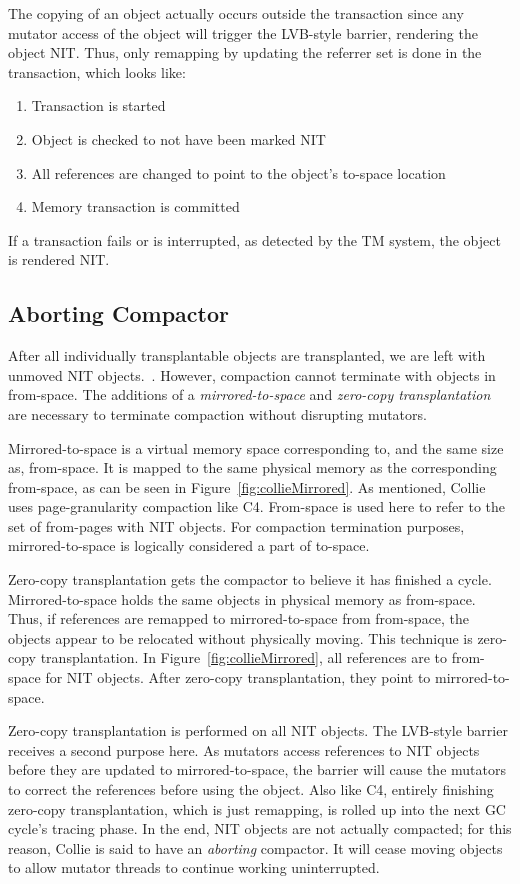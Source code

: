 \documentclass{sig-alternate}
\begin{document}
The copying of an object actually occurs outside the transaction since any
mutator access of the object will trigger the LVB-style barrier,
rendering the object NIT. Thus, only remapping by updating the referrer set
is done in the transaction, which looks like:
\begin{enumerate}
\item Transaction is started
\item Object is checked to not have been marked NIT
\item All references are changed to point to the object's to-space location
\item Memory transaction is committed
\end{enumerate}
If a transaction fails or is interrupted, as detected by the TM system, the object is rendered NIT.


\subsection{Aborting Compactor}
\label{sec:collieAbortion}

After all individually transplantable objects are transplanted, we
are left with unmoved NIT objects.~\cite{Iyengar:Collie}.
However, compaction cannot terminate with objects in from-space.
The additions of a \emph{mirrored-to-space} and \emph{zero-copy transplantation} are necessary
to terminate compaction without disrupting mutators.

Mirrored-to-space is a virtual memory space corresponding to, and the same
size as, from-space. It is mapped to the same physical
memory as the corresponding from-space, as can be seen in Figure~\ref{fig:collieMirrored}. As mentioned, 
Collie uses page-granularity compaction like C4. From-space is used here 
to refer to the set of from-pages with NIT objects. For compaction 
termination purposes, mirrored-to-space is logically considered a part of to-space.

Zero-copy transplantation gets the compactor to believe it has finished a cycle.
Mirrored-to-space holds the same objects in physical memory as from-space.
Thus, if references
are remapped to mirrored-to-space from from-space,
the objects appear to be relocated without physically moving. This technique
is zero-copy transplantation. In Figure~\ref{fig:collieMirrored},
all references are to from-space for NIT objects. After zero-copy transplantation, they
point to mirrored-to-space.

Zero-copy transplantation
is performed on all NIT objects. The LVB-style barrier receives a second purpose here. As mutators
access references to NIT objects before they are updated to mirrored-to-space, 
the barrier will cause the mutators to correct the references before using the object. Also like
C4, entirely finishing zero-copy transplantation, which is just remapping, is rolled
up into the next GC cycle's tracing phase. In the end, NIT objects are not actually compacted;
for this reason, Collie is said to have an \emph{aborting} compactor. It will
cease moving objects to allow mutator threads to continue working uninterrupted.
\end{document}
